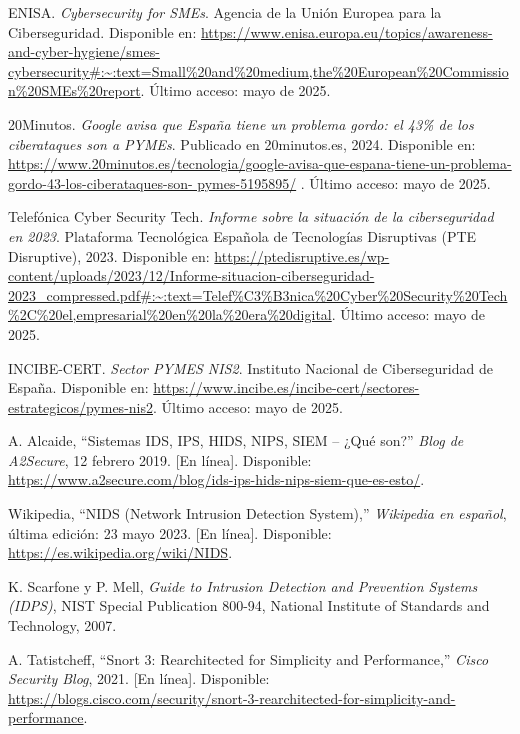 \documentclass[11pt,a4paper,twoside]{report}
\begin{document}
\begin{thebibliography}{99}
	\sloppy 
	
	ENISA. \textit{Cybersecurity for SMEs}. Agencia de la Unión Europea para la Ciberseguridad. Disponible en: \url{https://www.enisa.europa.eu/topics/awareness-and-cyber-hygiene/smes-cybersecurity#:~:text=Small\%20and\%20medium,the\%20European\%20Commission\%20SMEs\%20report}. Último acceso: mayo de 2025.
	
20Minutos. \textit{Google avisa que España tiene un problema gordo: el 43\% de los ciberataques son a PYMEs}. Publicado en 20minutos.es, 2024. Disponible en: 
\href{https://www.20minutos.es/tecnologia/google-avisa-que-espana-tiene-un-problema-gordo-43-los-ciberataques-son-pymes-5195895/}%
{https://www.20minutos.es/tecnologia/google-avisa-que-espana-tiene-un-problema-gordo-43-los-ciberataques-son-%
	pymes-5195895/}
. Último acceso: mayo de 2025.

	
	Telefónica Cyber Security Tech. \textit{Informe sobre la situación de la ciberseguridad en 2023}. Plataforma Tecnológica Española de Tecnologías Disruptivas (PTE Disruptive), 2023. Disponible en: \url{https://ptedisruptive.es/wp-content/uploads/2023/12/Informe-situacion-ciberseguridad-2023_compressed.pdf#:~:text=Telef\%C3\%B3nica\%20Cyber\%20Security\%20Tech\%2C\%20el,empresarial\%20en\%20la\%20era\%20digital}. Último acceso: mayo de 2025.
	
	INCIBE-CERT. \textit{Sector PYMES NIS2}. Instituto Nacional de Ciberseguridad de España. Disponible en: \url{https://www.incibe.es/incibe-cert/sectores-estrategicos/pymes-nis2}. Último acceso: mayo de 2025.
	
	 A. Alcaide, “Sistemas IDS, IPS, HIDS, NIPS, SIEM – ¿Qué son?” \textit{Blog de A2Secure}, 12 febrero 2019. [En línea]. Disponible: \url{https://www.a2secure.com/blog/ids-ips-hids-nips-siem-que-es-esto/}.
	
	 Wikipedia, “NIDS (Network Intrusion Detection System),” \textit{Wikipedia en español}, última edición: 23 mayo 2023. [En línea]. Disponible: \url{https://es.wikipedia.org/wiki/NIDS}.
	
	 K. Scarfone y P. Mell, \textit{Guide to Intrusion Detection and Prevention Systems (IDPS)}, NIST Special Publication 800-94, National Institute of Standards and Technology, 2007.
	
	 A. Tatistcheff, “Snort 3: Rearchitected for Simplicity and Performance,” \textit{Cisco Security Blog}, 2021. [En línea]. Disponible: \url{https://blogs.cisco.com/security/snort-3-rearchitected-for-simplicity-and-performance}.
	

\end{thebibliography}
\end{document}
